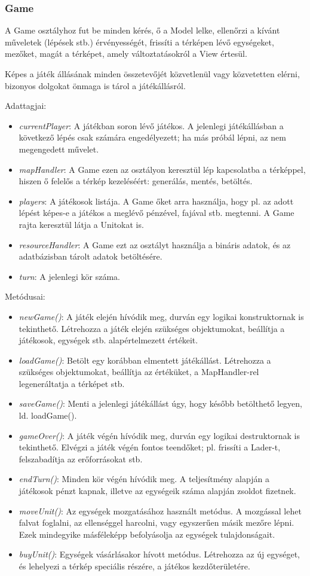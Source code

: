 \documentclass[a4paper,12pt]{report}
\begin{document}
\subsubsection{Game}
A Game osztályhoz fut be minden kérés, ő a Model lelke, ellenőrzi a kívánt műveletek (lépések stb.) érvényességét, frissíti a térképen lévő egységeket, mezőket, magát a térképet, amely változtatásokról a View értesül.

Képes a játék állásának minden összetevőjét közvetlenül vagy közvetetten elérni, bizonyos dolgokat önmaga is tárol a játékállásról.

Adattagjai:
\begin{itemize}
\item \textit{currentPlayer}: A játékban soron lévő játékos. A jelenlegi játékállásban a következő lépés csak számára engedélyezett; ha más próbál lépni, az nem megengedett művelet.
\item \textit{mapHandler}: A Game ezen az osztályon keresztül lép kapcsolatba a térképpel, hiszen ő felelős a térkép kezeléséért: generálás, mentés, betöltés.
\item \textit{players}: A játékosok listája. A Game őket arra használja, hogy pl. az adott lépést képes-e a játékos a meglévő pénzével, fajával stb. megtenni. A Game rajta keresztül látja a Unitokat is.
\item \textit{resourceHandler}: A Game ezt az osztályt használja a bináris adatok, és az adatbázisban tárolt adatok betöltésére.
\item \textit{turn}: A jelenlegi kör száma.
\end{itemize}

Metódusai:
\begin{itemize}
\item \textit{newGame()}: A játék elején hívódik meg, durván egy logikai konstruktornak is tekinthető. Létrehozza a játék elején szükséges objektumokat, beállítja a játékosok, egységek stb. alapértelmezett értékeit.
\item \textit{loadGame()}: Betölt egy korábban elmentett játékállást. Létrehozza a szükséges objektumokat, beállítja az értéküket, a MapHandler-rel legeneráltatja a térképet stb.
\item \textit{saveGame()}: Menti a jelenlegi játékállást úgy, hogy később betölthető legyen, ld. loadGame().
\item \textit{gameOver()}: A játék végén hívódik meg, durván egy logikai destruktornak is tekinthető. Elvégzi a játék végén fontos teendőket; pl. frissíti a Lader-t, felszabadítja az erőforrásokat stb.
\item \textit{endTurn()}: Minden kör végén hívódik meg. A teljesítmény alapján a játékosok pénzt kapnak, illetve az egységeik száma alapján zsoldot fizetnek.
\item \textit{moveUnit()}: Az egységek mozgatásához használt metódus. A mozgással lehet falvat foglalni, az ellenséggel harcolni, vagy egyszerűen másik mezőre lépni. Ezek mindegyike másféleképp befolyásolja az egységek tulajdonságait.
\item \textit{buyUnit()}: Egységek vásárlásakor hívott metódus. Létrehozza az új egységet, és lehelyezi a térkép speciális részére, a játékos kezdőterületére.
\end{itemize}
\end{document}
